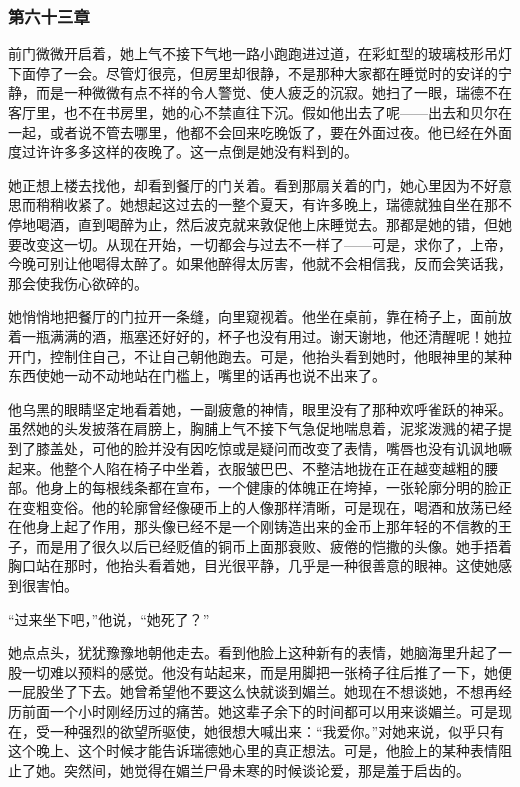\subsubsection{第六十三章}

\par 前门微微开启着，她上气不接下气地一路小跑跑进过道，在彩虹型的玻璃枝形吊灯下面停了一会。尽管灯很亮，但房里却很静，不是那种大家都在睡觉时的安详的宁静，而是一种微微有点不祥的令人警觉、使人疲乏的沉寂。她扫了一眼，瑞德不在客厅里，也不在书房里，她的心不禁直往下沉。假如他出去了呢——出去和贝尔在一起，或者说不管去哪里，他都不会回来吃晚饭了，要在外面过夜。他已经在外面度过许许多多这样的夜晚了。这一点倒是她没有料到的。
\par 她正想上楼去找他，却看到餐厅的门关着。看到那扇关着的门，她心里因为不好意思而稍稍收紧了。她想起这过去的一整个夏天，有许多晚上，瑞德就独自坐在那不停地喝酒，直到喝醉为止，然后波克就来敦促他上床睡觉去。那都是她的错，但她要改变这一切。从现在开始，一切都会与过去不一样了——可是，求你了，上帝，今晚可别让他喝得太醉了。如果他醉得太厉害，他就不会相信我，反而会笑话我，那会使我伤心欲碎的。
\par 她悄悄地把餐厅的门拉开一条缝，向里窥视着。他坐在桌前，靠在椅子上，面前放着一瓶满满的酒，瓶塞还好好的，杯子也没有用过。谢天谢地，他还清醒呢！她拉开门，控制住自己，不让自己朝他跑去。可是，他抬头看到她时，他眼神里的某种东西使她一动不动地站在门槛上，嘴里的话再也说不出来了。
\par 他乌黑的眼睛坚定地看着她，一副疲惫的神情，眼里没有了那种欢呼雀跃的神采。虽然她的头发披落在肩膀上，胸脯上气不接下气急促地喘息着，泥浆泼溅的裙子提到了膝盖处，可他的脸并没有因吃惊或是疑问而改变了表情，嘴唇也没有讥讽地噘起来。他整个人陷在椅子中坐着，衣服皱巴巴、不整洁地拢在正在越变越粗的腰部。他身上的每根线条都在宣布，一个健康的体魄正在垮掉，一张轮廓分明的脸正在变粗变俗。他的轮廓曾经像硬币上的人像那样清晰，可是现在，喝酒和放荡已经在他身上起了作用，那头像已经不是一个刚铸造出来的金币上那年轻的不信教的王子，而是用了很久以后已经贬值的铜币上面那衰败、疲倦的恺撒的头像。她手捂着胸口站在那时，他抬头看着她，目光很平静，几乎是一种很善意的眼神。这使她感到很害怕。
\par “过来坐下吧，”他说，“她死了？”
\par 她点点头，犹犹豫豫地朝他走去。看到他脸上这种新有的表情，她脑海里升起了一股一切难以预料的感觉。他没有站起来，而是用脚把一张椅子往后推了一下，她便一屁股坐了下去。她曾希望他不要这么快就谈到媚兰。她现在不想谈她，不想再经历前面一个小时刚经历过的痛苦。她这辈子余下的时间都可以用来谈媚兰。可是现在，受一种强烈的欲望所驱使，她很想大喊出来：“我爱你。”对她来说，似乎只有这个晚上、这个时候才能告诉瑞德她心里的真正想法。可是，他脸上的某种表情阻止了她。突然间，她觉得在媚兰尸骨未寒的时候谈论爱，那是羞于启齿的。
